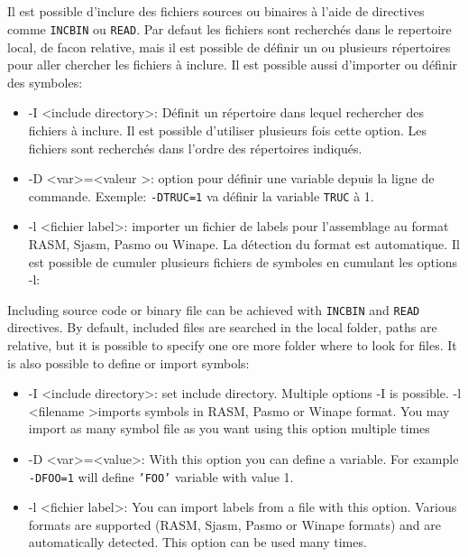 \subsection{}


\begin{xfr}
  Il est possible d'inclure des fichiers sources ou binaires à l'aide de directives comme \texttt{INCBIN} ou \texttt{READ}. Par defaut les fichiers sont recherchés dans le repertoire local, de facon relative, mais il est possible de définir un ou plusieurs répertoires pour aller chercher les fichiers à inclure. Il est possible aussi d'importer ou définir des symboles:

  \begin{itemize}
    \item -I \textless include directory\textgreater : Définit un répertoire dans lequel rechercher des fichiers à inclure. Il est possible d'utiliser plusieurs fois cette option. Les fichiers sont recherchés dans l'ordre des répertoires indiqués.
    \item -D \textless var\textgreater =\textless valeur \textgreater: option pour définir une variable depuis la ligne de commande. Exemple: \texttt{-DTRUC=1} va définir la variable \texttt{TRUC} à 1.
    \item -l \textless fichier label\textgreater: importer un fichier de labels pour l'assemblage au format RASM, Sjasm, Pasmo ou Winape. La détection du format est automatique.  Il est possible de cumuler plusieurs fichiers de symboles en cumulant les options -l:

  \end{itemize}
\end{xfr}

\begin{xen}
Including source code or binary file can be achieved with \texttt{INCBIN} and \texttt{READ} directives.
By default, included files are searched in the local folder, paths are relative, but it is possible to specify one ore more folder where to look for files. It is also possible to define or import symbols:
  \begin{itemize}
    \item -I \textless include directory\textgreater :	set include directory. Multiple options -I is possible.
	-l \textless filename \textgreater	imports symbols in RASM, Pasmo or Winape format.
	You may import as many symbol file as you want using this option multiple times
    \item -D \textless var\textgreater =\textless value\textgreater: With this option you can define a variable. For example \texttt{-DFOO=1} will define \texttt{'FOO'} variable with value 1.
    \item -l \textless fichier label\textgreater: You can import labels from a file with this option. Various formats are supported (RASM, Sjasm, Pasmo or Winape formats) and are automatically detected.  This option can be used many times.
  \end{itemize}
\end{xen}

